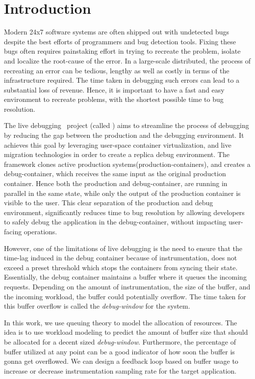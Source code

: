 \section{Introduction}
\label{sec:intro}

Modern 24x7 software systems are often shipped out with undetected bugs despite the best efforts of programmers and bug detection tools. 
Fixing these bugs often requires painstaking effort in trying to recreate the problem, isolate and localize the root-cause of the error.
In a large-scale distributed, the process of recreating an error can be tedious, lengthy as well as costly in terms of the infrastructure required.
The time taken in debugging such errors can lead to a substantial loss of revenue.
Hence, it is important to have a fast and easy environment to recreate problems, with the shortest possible time to bug resolution.

The live debugging~\cite{parikshan} project (called \parikshan) aims to streamline the process of debugging by reducing the gap between the production and the debugging environment. 
It achieves this goal by leveraging user-space container virtualization, and live migration technologies in order to create a replica debug environment. 
The framework clones active production systems(production-containers), and creates a debug-container, which receives the same input as the original production container.
Hence both the production and debug-container, are running in parallel in the same state, while only the output of the production container is visible to the user.
This clear separation of the production and debug environment, significantly reduces time to bug resolution by allowing developers to safely debug the application in the debug-container, without impacting user-facing operations.

However, one of the limitations of live debugging is the need to ensure that the time-lag induced in the debug container because of instrumentation,  does not exceed a preset threshold which stops the containers from syncing their state.
Essentially, the debug container maintains a buffer where it queues the incoming requests.
Depending on the amount of instrumentation, the size of the buffer, and the incoming workload, the buffer could potentially overflow. 
The time taken for this buffer overflow is called the \textit{debug-window} for the system.

In this work, we use queuing theory to model the allocation of resources. The idea is to use workload modeling to predict the amount of buffer size that should be allocated for a decent sized \textit{debug-window}. Furthermore, the percentage of buffer utilized at any point can be a good indicator of how soon the buffer is gonna get overflowed. We can design a feedback loop based on buffer usage to increase or decrease instrumentation sampling rate for the target application.
